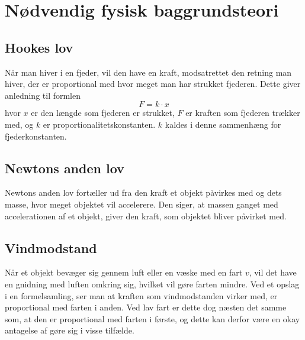 \section{Nødvendig fysisk baggrundsteori}
\subsection{Hookes lov}\label{teori:Hooks lov}
Når man hiver i en fjeder, vil den have en kraft, modsatrettet den retning man hiver, der er proportional med hvor meget man har strukket fjederen. 
Dette giver anledning til formlen 
$$F =k\cdot x$$
hvor $x$ er den længde som fjederen er strukket, $F$ er kraften som fjederen trækker med, og $k$ er proportionalitetskonstanten. 
$k$ kaldes i denne sammenhæng for fjederkonstanten.

\subsection{Newtons anden lov}\label{teori:Newtons anden lov}
Newtons anden lov fortæller ud fra den kraft et objekt påvirkes med og dets masse, hvor meget objektet vil accelerere. 
Den siger, at massen ganget med accelerationen af et objekt, giver den kraft, som objektet bliver påvirket med.

\subsection{Vindmodstand}\label{teori:vindmodstand}
Når et objekt bevæger sig gennem luft eller en væske med en fart $v$, vil det have en gnidning med luften omkring sig, hvilket vil gøre farten mindre.
Ved et opslag i en formelsamling, ser man at kraften som vindmodstanden virker med, er proportional med farten i anden. 
Ved lav fart er dette dog næsten det samme som, at den er proportional med farten i første, og dette kan derfor være en okay antagelse af gøre sig i visse tilfælde.
